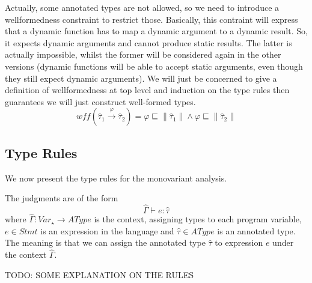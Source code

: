 \documentclass[a4wide,12pt]{article}
\theoremstyle{definition}
\theoremstyle{plain}
\theoremstyle{remark}
\def\sqleq{\sqsubseteq}
\def\htau{\hat{\tau}}
\def\HGamma{\hat{\Gamma}}
\def\judge#1#2#3{#1 \vdash #2 : #3}
\def\annot#1{\|#1\|}
\begin{document}
Actually, some annotated types are not allowed, so we need to introduce a wellformedness
constraint to restrict those. Basically, this contraint will express that a dynamic function
has to map a dynamic argument to a dynamic result. So, it 
expects dynamic arguments and cannot produce static results. The latter is actually
impossible, whilst the former will be considered again in the other versions
(dynamic functions will be able to accept static arguments, even though they still expect dynamic arguments).
We will just be concerned to give a definition of wellformedness at top level and
induction on the type rules then guarantees we will just construct
well-formed types.
\[
wff(\htau_1 \overset{\varphi}{\to} \htau_2) 
= \varphi \sqleq \annot{\htau_1}
 \land   \varphi \sqleq \annot{\htau_2}
\]

\subsection{Type Rules}
We now present the type rules for the monovariant analysis.

The judgments are of the form
\[\judge{\HGamma}{e}{\htau}\]
where $\HGamma: Var_\star \to AType$ is the context, assigning types to each program variable, 
$e \in Stmt$ is an expression in the  language and $\htau \in AType$ is an annotated type.
The meaning is that we can assign the annotated type $\htau$ to expression $e$ under the context $\HGamma$. 

TODO: SOME EXPLANATION ON THE RULES
\end{document}
